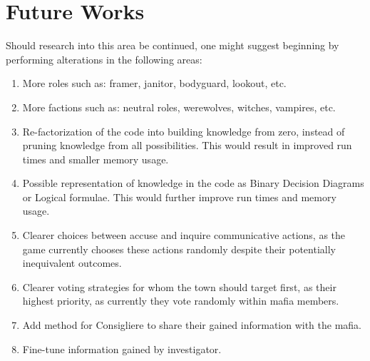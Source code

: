 \section{Future Works}\label{sec:future-works}
Should research into this area be continued, one might suggest beginning by
performing alterations in the following areas:
\begin{enumerate}
	\itemsep0px 
	\item More roles such as: framer, janitor, bodyguard, lookout, etc.
	\item More factions such as: neutral roles, werewolves, witches, vampires, etc.
	\item Re-factorization of the code into building knowledge from zero, instead of
	      pruning knowledge from all possibilities. This would result in improved run
	      times and smaller memory usage.
	\item Possible representation of knowledge in the code as Binary Decision Diagrams or
	      Logical formulae. This would further improve run times and memory usage.
	\item Clearer choices between accuse and inquire communicative actions, as the game
	      currently chooses these actions randomly despite their potentially inequivalent
	      outcomes.
	\item Clearer voting strategies for whom the town should target first, as their
	      highest priority, as currently they vote randomly within mafia members.
	\item Add method for Consigliere to share their gained information with the mafia.
	\item Fine-tune information gained by investigator.
\end{enumerate}